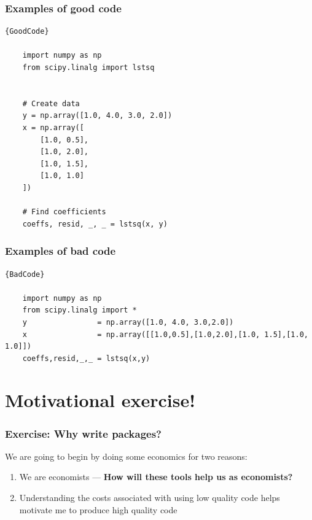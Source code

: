 \documentclass[10pt]{beamer}
\begin{document}
  \begin{frame}[fragile] \frametitle{Examples of good code}

    {\small
    \begin{lstlisting}{GoodCode}

    import numpy as np
    from scipy.linalg import lstsq


    # Create data
    y = np.array([1.0, 4.0, 3.0, 2.0])
    x = np.array([
        [1.0, 0.5],
        [1.0, 2.0],
        [1.0, 1.5],
        [1.0, 1.0]
    ])

    # Find coefficients
    coeffs, resid, _, _ = lstsq(x, y)

    \end{lstlisting}
    }

  \end{frame}

  \begin{frame}[fragile] \frametitle{Examples of bad code}

    {\small
    \begin{lstlisting}{BadCode}

    import numpy as np
    from scipy.linalg import *
    y                = np.array([1.0, 4.0, 3.0,2.0])
    x                = np.array([[1.0,0.5],[1.0,2.0],[1.0, 1.5],[1.0, 1.0]])
    coeffs,resid,_,_ = lstsq(x,y)

    \end{lstlisting}
    }

  \end{frame}



\section{Motivational exercise!}

  \begin{frame} \frametitle{Exercise: Why write packages?}

    We are going to begin by doing some economics for two reasons:

    \begin{enumerate}
      \item We are economists --- \textbf{How will these tools help us as economists?}
      \item Understanding the costs associated with using low quality code helps
        motivate me to produce high quality code
    \end{enumerate}

  \end{frame}
\end{document}
